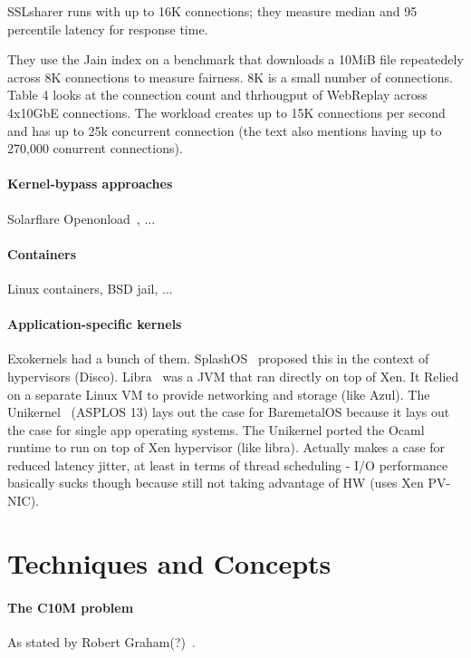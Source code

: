 SSLsharer runs with up to 16K connections; they measure median and 95
percentile latency for response time.

They use the Jain index on a benchmark that downloads a 10MiB file
repeatedely across 8K connections to measure fairness.  8K is a small
number of connections.  Table 4 looks at the connection count and
thrhougput of WebReplay across 4x10GbE connections.  The workload
creates up to 15K connections per second and has up to 25k concurrent
connection (the text also mentions having up to 270,000 conurrent
connections).




\paragraph*{Kernel-bypass approaches}  Solarflare Openonload~\cite{openonload}, ...

\paragraph*{Containers}  Linux containers, BSD jail, ...


\paragraph*{Application-specific kernels}  
Exokernels had a bunch of them.
SplashOS~\cite{DBLP:journals/tocs/BugnionDGR97} proposed this in the
context of hypervisors (Disco).
Libra~\cite{DBLP:conf/vee/AmmonsABSGKKRHW07} was a JVM that ran
directly on top of Xen.  It Relied on a separate Linux VM to provide
networking and storage (like Azul).  The
Unikernel~\cite{DBLP:conf/asplos/MadhavapeddyMRSSGSHC13} (ASPLOS 13)
lays out the case for BaremetalOS because it lays out the case for
single app operating systems.  The Unikernel ported the Ocaml runtime
to run on top of Xen hypervisor (like libra).  Actually makes a case
for reduced latency jitter, at least in terms of thread scheduling -
I/O performance basically sucks though because still not taking
advantage of HW (uses Xen PV-NIC).

\section{Techniques and Concepts}

\paragraph*{The C10M problem} As stated by Robert Graham(?)~\cite{theC10Mproblem}.


